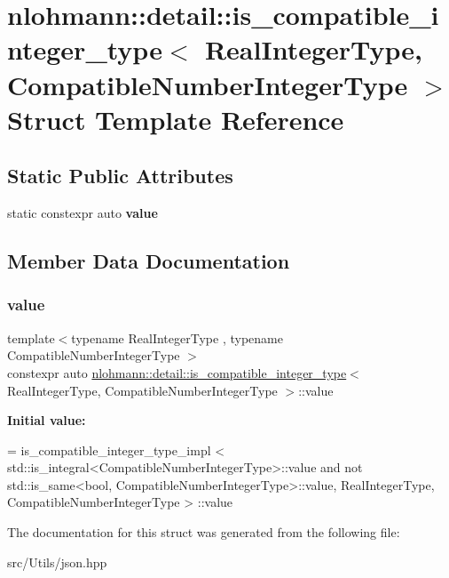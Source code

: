 \hypertarget{structnlohmann_1_1detail_1_1is__compatible__integer__type}{}\section{nlohmann\+:\+:detail\+:\+:is\+\_\+compatible\+\_\+integer\+\_\+type$<$ Real\+Integer\+Type, Compatible\+Number\+Integer\+Type $>$ Struct Template Reference}
\label{structnlohmann_1_1detail_1_1is__compatible__integer__type}
\subsection*{Static Public Attributes}
\begin{DoxyCompactItemize}
\item 
static constexpr auto {\bfseries value}
\end{DoxyCompactItemize}


\subsection{Member Data Documentation}
\mbox{\label{structnlohmann_1_1detail_1_1is__compatible__integer__type_ac5e5bd39773676564c73d3dd2a9c6e0a}} 
\subsubsection{\texorpdfstring{value}{value}}
{\footnotesize\ttfamily template$<$typename Real\+Integer\+Type , typename Compatible\+Number\+Integer\+Type $>$ \\
constexpr auto \mbox{\hyperlink{structnlohmann_1_1detail_1_1is__compatible__integer__type}{nlohmann\+::detail\+::is\+\_\+compatible\+\_\+integer\+\_\+type}}$<$ Real\+Integer\+Type, Compatible\+Number\+Integer\+Type $>$\+::value\hspace{0.3cm}{\ttfamily [static]}}

{\bfseries Initial value\+:}
\begin{DoxyCode}
=
        is\_compatible\_integer\_type\_impl <
        std::is\_integral<CompatibleNumberIntegerType>::value and
        not std::is\_same<bool, CompatibleNumberIntegerType>::value,
        RealIntegerType, CompatibleNumberIntegerType > ::value
\end{DoxyCode}


The documentation for this struct was generated from the following file\+:\begin{DoxyCompactItemize}
\item 
src/\+Utils/json.\+hpp\end{DoxyCompactItemize}
